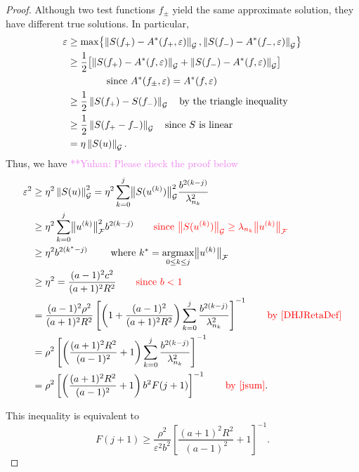 \documentclass[graybox,footinfo]{svmult}
\newcommand{\DHJRnorm}[2][{}]{\ensuremath{\left \lVert #2 \right \rVert}_{#1}}
\newcommand{\DHJRbignorm}[2][{}]{\ensuremath{\bigl \lVert #2 \bigr \rVert}_{#1}}
\newcommand{\yuhannote}[1]{ {\textcolor{violet}  {\mbox{**Yuhan:} #1}}}
\begin{document}
\begin{proof}
Although two test functions $f_\pm$ yield the same approximate solution, they have different true solutions.  In particular,
\begin{align*}
\varepsilon &\ge \max \bigl\{\DHJRnorm[\calG]{S(f_+) - A^*(f_+,\varepsilon)}, \DHJRnorm[\calG]{S(f_-) - A^*(f_-,\varepsilon)} \bigr\} \\
&\ge \frac 12 \bigl[\DHJRnorm[\calG]{S(f_+) - A^*(f,\varepsilon)} + \DHJRnorm[\calG]{S(f_-) - A^*(f,\varepsilon)}  \bigr] \\
&\qquad \qquad \text{since } A^*(f_\pm,\varepsilon) = A^*(f,\varepsilon) \\
&\ge \frac 12 \DHJRnorm[\calG]{S(f_+) - S(f_-)} \quad \text{by the triangle inequality}\\
&\ge \frac 12 \DHJRnorm[\calG]{S(f_+ - f_-)} \quad \text{since $S$ is linear}\\
&= \eta \DHJRnorm[\calG]{S(u)}.
\end{align*}
Thus, we have \yuhannote{Please check the proof below}
\begin{align*}
\varepsilon^2  & \ge \eta^2 \DHJRnorm[\calG]{S(u)}^2= 
\eta^2 \sum_{k=0}^{j} \DHJRbignorm[\calG]{S(u^{(k)})}^2  \frac{b^{2(k-j)}}{\lambda_{n_k}^2}\\
& \ge \eta^2 
\sum_{k=0}^{j} \DHJRbignorm[\calF]{u^{(k)}}^2 
b^{2(k-j)} 
\qquad {\color{red} \text{since } \DHJRbignorm[\calG]{S(u^{(k)})} \ge \lambda_{n_k} \DHJRbignorm[\calF]{u^{(k)}} }\\
& \ge  \eta^2 b^{2(k^{*}-j)} \qquad \text{ where } k^* = \argmax_{0 \le k \le j} \DHJRbignorm[\calF]{u^{(k)}} \\
& \ge \eta^2 = \frac{(a-1)^2c^2}{(a+1)^2R^2} 
\qquad {\color{red} \text{since } b < 1}\\
&
=\frac{(a-1)^2 \rho^2}{(a+1)^2R^2}\left[\left(1+\frac{(a-1)^2}{(a+1)^{2} R^2 }\right)\sum_{k=0}^j \frac{b^{2(k-j)}}{\lambda_{n_{k}}^2}\right]^{-1} 
\qquad {\color{red} \text{by \eqref{DHJRetaDef}}}\\
& =  \rho^2 \left[\left(\frac{(a+1)^{2} R^2 }{(a-1)^2} + 1\right)\sum_{k=0}^j \frac{b^{2(k-j)}}{\lambda_{n_{k}}^2}\right]^{-1} \\
& = \rho^2 \left[\left(\frac{(a+1)^{2} R^2 }{(a-1)^2} + 1\right) b^2F(j+1)\right]^{-1} 
\qquad {\color{red} \text{by \eqref{jsum}}}.
\end{align*}
{\color{red} This inequality is equivalent to 
\begin{equation}
    F(j+1) \ge  \frac{\rho^2}{\varepsilon^2 b^2}
\left[\frac{(a+1)^{2} R^2 }{(a-1)^2} + 1\right]^{-1}.
\end{equation}


}
\end{proof}
\end{document}
